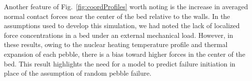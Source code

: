 Another feature of Fig.~\ref{fig:coordProfiles} worth noting is the increase in averaged normal contact forces near the center of the bed relative to the walls. In the assumptions used to develop this simulation, we had noted the lack of localized force concentrations in a bed under an external mechanical load. However, in these results, owing to the nuclear heating temperature profile and thermal expansion of each pebble, there is a bias toward higher forces in the center of the bed. This result highlights the need for a model to predict failure initiation in place of the assumption of random pebble failure. 

